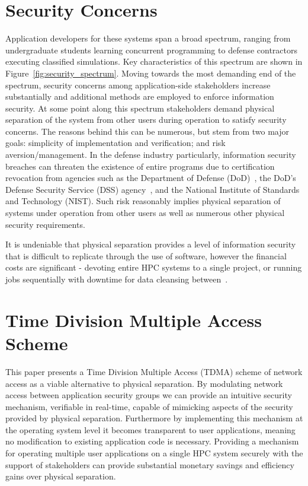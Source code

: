 \documentclass[oneside,12pt]{memoir}
\begin{document}
\section{Security Concerns}
Application developers for these systems span a broad spectrum, ranging from undergraduate students learning concurrent programming to defense contractors executing classified simulations. Key characteristics of this spectrum are shown in Figure~\ref{fig:security_spectrum}. Moving towards the most demanding end of the spectrum, security concerns among application-side stakeholders increase substantially and additional methods are employed to enforce information security. At some point along this spectrum stakeholders demand physical separation of the system from other users during operation to satisfy security concerns. The reasons behind this can be numerous, but stem from two major goals: simplicity of implementation and verification; and risk aversion/management. In the defense industry particularly, information security breaches can threaten the existence of entire programs due to certification revocation from agencies such as the Department of Defense (DoD)~\cite{classified_manual}, the DoD's Defense Security Service (DSS) agency~\cite{updatedclearing}, and the National Institute of Standards and Technology (NIST). Such risk reasonably implies physical separation of systems under operation from other users as well as numerous other physical security requirements. 

It is undeniable that physical separation provides a level of information security that is difficult to replicate through the use of software, however the financial costs are significant - devoting entire HPC systems to a single project, or running jobs sequentially with downtime for data cleansing between~\cite{updatedclearing}. 

\section{Time Division Multiple Access Scheme}
\label{sec:TDMA_intro}
This paper presents a Time Division Multiple Access (TDMA) scheme of network access as a viable alternative to physical separation. By modulating network access between application security groups we can provide an intuitive security mechanism, verifiable in real-time, capable of mimicking aspects of the security provided by physical separation. Furthermore by implementing this mechanism at the operating system level it becomes transparent to user applications, meaning no modification to existing application code is necessary. Providing a mechanism for operating multiple user applications on a single HPC system securely with the support of stakeholders can provide substantial monetary savings and efficiency gains over physical separation.
\end{document}
